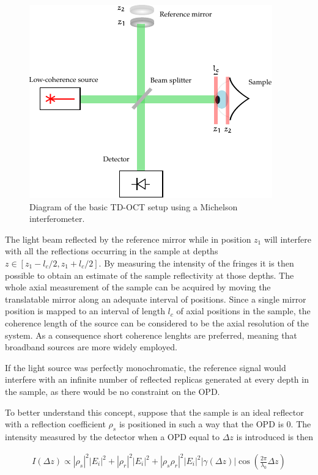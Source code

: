  
 \begin{figure}[hbt]
 	\myfloatalign
 	\includegraphics[width=0.8\linewidth]{gfx/tdoct}
 	\caption{Diagram of the basic \ac{TD-OCT} setup using a Michelson interferometer.}\label{fig:tdoct-michelson}
 \end{figure}
 
The light beam reflected by the reference mirror while in position $z_1$ will interfere with all the reflections occurring in the sample at depths $z \in [z_1 - l_c/2, z_1 + l_c/2]$. By measuring the intensity of the fringes it is then possible to obtain an estimate of the sample reflectivity at those depths. The whole axial measurement of the sample can be acquired by moving the translatable mirror along an adequate interval of positions. Since a single mirror position is mapped to an interval of length $l_c$ of axial positions in the sample, the coherence length of the source can be considered to be the axial resolution of the system. As a consequence short coherence lenghts are preferred, meaning that broadband sources are more widely employed. 

If the light source was perfectly monochromatic, the reference signal would interfere with an infinite number of reflected replicas generated at every depth in the sample, as there would be no constraint on the \ac{OPD}. 


To better understand this concept, suppose that the sample is an ideal reflector with a reflection coefficient $\rho_s$ is positioned in such a way that the \ac{OPD} is 0. The intensity measured by the detector when a \ac{OPD} equal to $\Delta z$ is introduced is then

\begin{align}\label{eq:tdoct-interference}
I(\Delta z) \propto |\rho_s|^2 |E_i|^2 + |\rho_r|^2 |E_i|^2 + |\rho_s\rho_r|^2|E_i|^2|\gamma(\Delta z)|\cos\left(\frac{2\pi}{\lambda_0}\Delta z\right)
\end{align}


